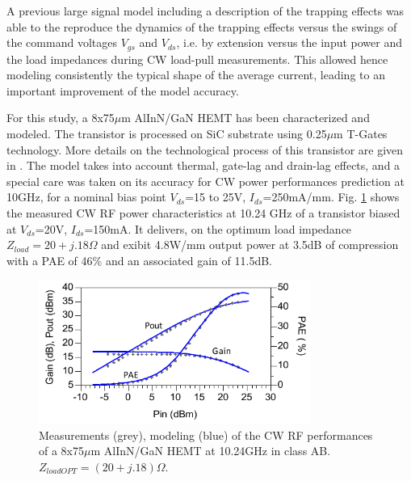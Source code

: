 \documentclass[conference]{IEEEtran}
\begin{document}
A previous large signal model including a description of the trapping effects \cite{Jardel2007b} was able to the reproduce the dynamics of the trapping effects versus the swings of the command voltages $V_{gs}$ and $V_{ds}$, i.e. by extension versus the input power and the load impedances during CW load-pull measurements. This allowed hence modeling consistently the typical shape of the average current, leading to an important improvement of the model accuracy.

For this study, a 8x75$\mu$m AlInN/GaN HEMT has been characterized and modeled. The transistor is processed on SiC substrate using 0.25$\mu$m T-Gates technology. More details on the technological process of this transistor are given in \cite{jardel2012first}.
The model takes into account thermal, gate-lag and drain-lag effects, and a special care was taken on its accuracy for CW power performances prediction at 10GHz, for a nominal bias point $V_{ds}$=15 to 25V, $I_{ds}$=250mA/mm.
Fig. \ref{LP} shows the measured CW RF power characteristics at 10.24 GHz of a transistor biased at $V_{ds}$=20V, $I_{ds}$=150mA.  It delivers, on the optimum load impedance $Z_{load}=20+j.18\Omega$ and exibit 4.8W/mm output power at 3.5dB of compression with a PAE of 46\% and an associated gain of 11.5dB.

\begin{figure}[ht!] %
    \centering
    \includegraphics[width=3.5in]{FigureLP_ancien_mod.pdf}
    \caption{Measurements (grey), modeling (blue) of the CW RF performances of a 8x75$\mu$m AlInN/GaN HEMT at 10.24GHz in class AB. $Z_{loadOPT} = (20+j.18) \Omega$.}
    \label{LP}
\end{figure}
\end{document}

